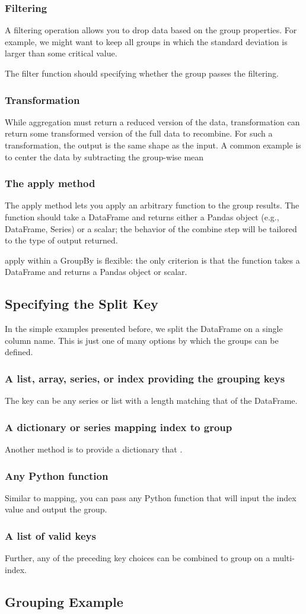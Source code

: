 \subsubsection*{Filtering}
A filtering operation allows you to drop data based on the group properties. For
example, we might want to keep all groups in which the standard deviation is larger
than some critical value.

The filter function should  specifying whether the group passes
the filtering.
\subsubsection*{Transformation}
While aggregation must return a reduced version of the data, transformation can
return some transformed version of the full data to recombine. For such a transformation, the output is the same shape as the input. A common example is to center the
data by subtracting the group-wise mean
\subsubsection*{The apply method}
The apply method lets you apply an arbitrary function to the group results. The
function should take a DataFrame and returns either a Pandas object (e.g., DataFrame,
Series) or a scalar; the behavior of the combine step will be tailored to the type of
output returned.

apply within a GroupBy is flexible: the only criterion is that the function takes a
DataFrame and returns a Pandas object or scalar.
\subsection*{Specifying the Split Key}
In the simple examples presented before, we split the DataFrame on a single column
name. This is just one of many options by which the groups can be defined.
\subsubsection*{A list, array, series, or index providing the grouping keys}
The key can be any series or list with a length matching that of the DataFrame.


\subsubsection*{A dictionary or series mapping index to group}
Another method is to provide a dictionary that .
\subsubsection*{Any Python function}
Similar to mapping, you can pass any Python function that will input the index value
and output the group.

\subsubsection*{A list of valid keys}
Further, any of the preceding key choices can be combined to group on a multi-index.
\subsection*{Grouping Example}